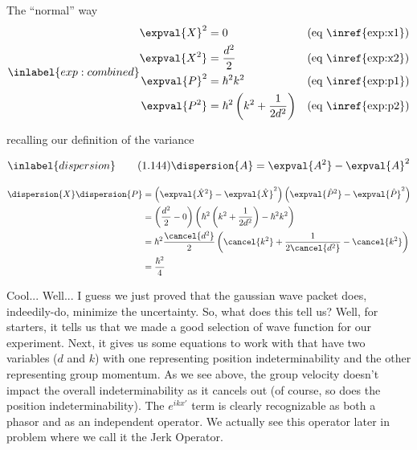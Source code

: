 \begin{answer}
\begin{answerpart}{The ``normal'' way}
    \begin{equation}
      \inlabel{exp:combined}
      \begin{alignedat}{2}
        \expval{X}^2 &= 0 & \quad{} &\text{(eq \inref{exp:x1})}\\
        \expval{X^2} &= \frac{d^2}{2} & &\text{(eq \inref{exp:x2})}\\
        \expval{P}^2 &= \hbar^2k^2 & &\text{(eq \inref{exp:p1})}\\
        \expval{P^2} &=
        \hbar^2
        \left(
        k^2
        +
        \frac{1}{2d^2}
        \right)
        & &\text{(eq \inref{exp:p2})}\\
      \end{alignedat}
    \end{equation}
    
    recalling our definition of the variance

    \begin{equation}
      \inlabel{dispersion}
      \tag{1.144}
      \dispersion{A} = \expval{A^2} - \expval{A}^2
    \end{equation}

    \begin{equation}
      \begin{split}
        \dispersion{X}\dispersion{P}
        &=
        \left(\expval{\hat{X}^2} - \expval{\hat{X}}^2\right)
        \left(\expval{\hat{P}^2} - \expval{\hat{P}}^2\right)
        \\
        &=
        \left(\frac{d^2}{2} - 0\right)
        \left(
        \hbar^2
        \left(
        k^2
        +
        \frac{1}{2d^2}
        \right)
        - \hbar^2k^2
        \right)
        \\
        &=
        \hbar^2
        \frac{\cancel{d^2}}{2}
        \left(
        \cancel{k^2}
        +
        \frac{1}{2\cancel{d^2}}
        - \cancel{k^2}
        \right)
        \\
        &= \frac{\hbar^2}{4}
      \end{split}
    \end{equation}

    Cool...  Well... I guess we just proved that the gaussian wave
    packet does, indeedily-do, minimize the uncertainty.  So, what
    does this tell us?  Well, for starters, it tells us that we made a
    good selection of wave function for our experiment.  Next, it
    gives us some equations to work with that have two variables ($d$
    and $k$) with one representing position indeterminability and the
    other representing group momentum.  As we see above, the group
    velocity doesn't impact the overall indeterminability as it
    cancels out (of course, so does the position indeterminability).
    The $e^{ikx'}$ term is clearly recognizable as both a phasor and
    as an independent operator.  We actually see this operator later
    in problem  where we call it the Jerk
    Operator.


\end{answerpart}
\end{answer}
